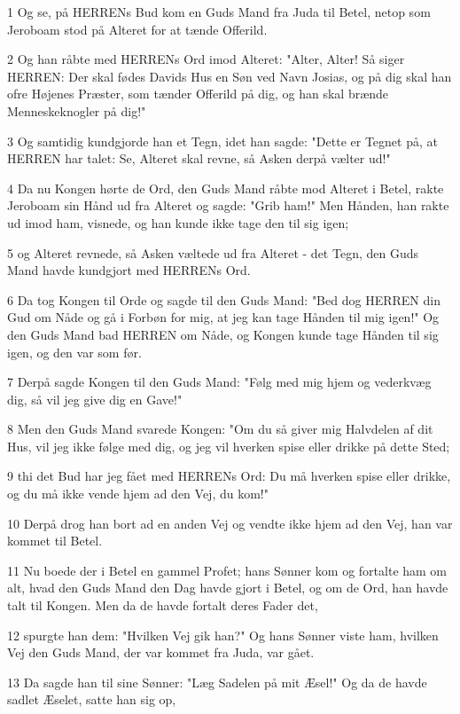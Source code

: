 \par 1 Og se, på HERRENs Bud kom en Guds Mand fra Juda til Betel, netop som Jeroboam stod på Alteret for at tænde Offerild.
\par 2 Og han råbte med HERRENs Ord imod Alteret: "Alter, Alter! Så siger HERREN: Der skal fødes Davids Hus en Søn ved Navn Josias, og på dig skal han ofre Højenes Præster, som tænder Offerild på dig, og han skal brænde Menneskeknogler på dig!"
\par 3 Og samtidig kundgjorde han et Tegn, idet han sagde: "Dette er Tegnet på, at HERREN har talet: Se, Alteret skal revne, så Asken derpå vælter ud!"
\par 4 Da nu Kongen hørte de Ord, den Guds Mand råbte mod Alteret i Betel, rakte Jeroboam sin Hånd ud fra Alteret og sagde: "Grib ham!" Men Hånden, han rakte ud imod ham, visnede, og han kunde ikke tage den til sig igen;
\par 5 og Alteret revnede, så Asken væltede ud fra Alteret - det Tegn, den Guds Mand havde kundgjort med HERRENs Ord.
\par 6 Da tog Kongen til Orde og sagde til den Guds Mand: "Bed dog HERREN din Gud om Nåde og gå i Forbøn for mig, at jeg kan tage Hånden til mig igen!" Og den Guds Mand bad HERREN om Nåde, og Kongen kunde tage Hånden til sig igen, og den var som før.
\par 7 Derpå sagde Kongen til den Guds Mand: "Følg med mig hjem og vederkvæg dig, så vil jeg give dig en Gave!"
\par 8 Men den Guds Mand svarede Kongen: "Om du så giver mig Halvdelen af dit Hus, vil jeg ikke følge med dig, og jeg vil hverken spise eller drikke på dette Sted;
\par 9 thi det Bud har jeg fået med HERRENs Ord: Du må hverken spise eller drikke, og du må ikke vende hjem ad den Vej, du kom!"
\par 10 Derpå drog han bort ad en anden Vej og vendte ikke hjem ad den Vej, han var kommet til Betel.
\par 11 Nu boede der i Betel en gammel Profet; hans Sønner kom og fortalte ham om alt, hvad den Guds Mand den Dag havde gjort i Betel, og om de Ord, han havde talt til Kongen. Men da de havde fortalt deres Fader det,
\par 12 spurgte han dem: "Hvilken Vej gik han?" Og hans Sønner viste ham, hvilken Vej den Guds Mand, der var kommet fra Juda, var gået.
\par 13 Da sagde han til sine Sønner: "Læg Sadelen på mit Æsel!" Og da de havde sadlet Æselet, satte han sig op,
